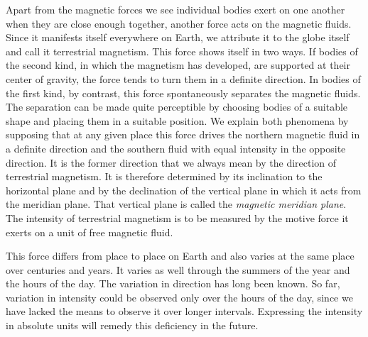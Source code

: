 Apart from the magnetic forces we see individual bodies exert on one another when they are close enough together, another force acts on the magnetic fluids. Since it manifests itself everywhere on Earth, we attribute it to the globe itself and call it terrestrial magnetism. This force shows itself in two ways. If bodies of the second kind, in which the magnetism has developed, are supported at their center of gravity, the force tends to turn them in a definite direction. In bodies of the first kind, by contrast, this force spontaneously separates the magnetic fluids. The separation can be made quite perceptible by choosing bodies of a suitable shape and placing them in a suitable position. We explain both phenomena by supposing that at any given place this force drives the northern magnetic fluid in a definite direction and the southern fluid with equal intensity in the opposite direction. It is the former direction that we always mean by the direction of terrestrial magnetism. It is therefore determined by its inclination to the horizontal plane and by the declination of the vertical plane in which it acts from the meridian plane. That vertical plane is called the \textit{magnetic meridian plane}. The intensity of terrestrial magnetism is to be measured by the motive force it exerts on a unit of free magnetic fluid.

This force differs from place to place on Earth and also varies at the same place over centuries and years. It varies as well through the summers of the year and the hours of the day. The variation in direction has long been known. So far, variation in intensity could be observed only over the hours of the day, since we have lacked the means to observe it over longer intervals. Expressing the intensity in absolute units will remedy this deficiency in the future.

